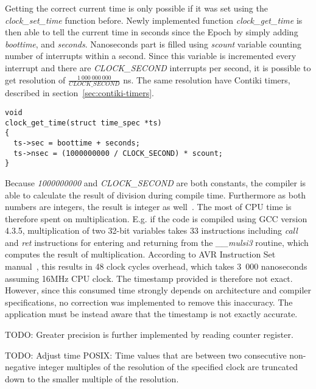 Getting the correct current time is only possible if it was set using
the {\it{clock\_set\_time}} function before.
Newly implemented function {\it{clock\_get\_time}} is then able to tell the
current time in seconds since the Epoch by simply adding {\it{boottime}},
and {\it{seconds}}.
Nanoseconds part is filled using {\it{scount}} variable counting number of
interrupts within a second.
Since this variable is incremented every interrupt and there are {\it{CLOCK\_SECOND}} interrupts
per second, it is possible to get resolution of $\frac{1~000~000~000}{CLOCK\_SECOND}$ ns.
The same resolution have Contiki timers, described in section~\ref{sec:contiki-timers}.
\begin{lstlisting}
void
clock_get_time(struct time_spec *ts)
{
  ts->sec = boottime + seconds;
  ts->nsec = (1000000000 / CLOCK_SECOND) * scount;
}
\end{lstlisting}
Because {\it{1000000000}} and {\it{CLOCK\_SECOND}} are both constants, the compiler is able to
calculate the result of division during compile time.
Furthermore as both numbers are integers, the result is integer as well~\cite{c99}.
The most of CPU time is therefore spent on multiplication.
E.g. if the code is compiled using GCC version 4.3.5,
multiplication of two 32-bit variables takes 33 instructions including {\it{call}} and {\it{ret}}
instructions for entering and returning from the {\it{\_\_mulsi3}} routine, which computes
the result of multiplication.
According to AVR Instruction Set manual~\cite{avr-instruction-set},
this results in 48 clock cycles overhead,
which takes 3~000 nanoseconds assuming 16MHz CPU clock.
The timestamp provided is therefore not exact.
However, since this consumed time strongly depends on architecture and compiler specifications,
no correction was implemented to remove this inaccuracy.
The application must be instead aware that the timestamp is not exactly accurate.

TODO: Greater precision is further implemented by reading counter register.

TODO: Adjust time
POSIX:
Time values that are between two consecutive non-negative integer multiples
of the resolution of the specified clock are truncated down to the smaller multiple of the resolution.
